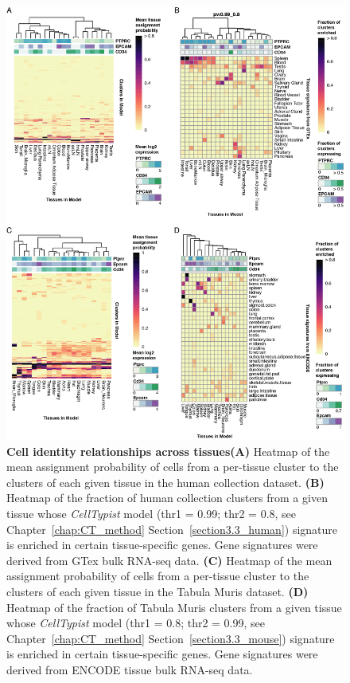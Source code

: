 \begin{figure}[pht!]
    \centering    
    \includegraphics[scale=0.66]{Chapter4/Figs/chap4_tissuefig.png} %
    \caption[Cell identity relationships across tissues]{\textbf{Cell identity relationships across tissues}\newline\textbf{(A)} Heatmap of the mean assignment probability of cells from a per-tissue cluster to the clusters of each given tissue in the human collection dataset. \textbf{(B)} Heatmap of the fraction of human collection clusters from a given tissue whose \textit{CellTypist} model (thr1 = 0.99; thr2 = 0.8, see Chapter~\ref{chap:CT_method} Section~\ref{section3.3_human}) signature is enriched in certain tissue-specific genes. Gene signatures were derived from GTex bulk RNA-seq data. \textbf{(C)} Heatmap of the mean assignment probability of cells from a per-tissue cluster to the clusters of each given tissue in the Tabula Muris dataset. \textbf{(D)} Heatmap of the fraction of Tabula Muris clusters from a given tissue whose \textit{CellTypist} model (thr1 = 0.8; thr2 = 0.99, see Chapter~\ref{chap:CT_method} Section~\ref{section3.3_mouse}) signature is enriched in certain tissue-specific genes. Gene signatures were derived from ENCODE tissue bulk RNA-seq data.}
    \label{fig:chap4_tiss}
\end{figure}

